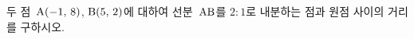 두 점~$\mathrm{A}(-1,\mkern3mu 8)$, $\mathrm{B}(5,\mkern3mu 2)$에 대하여 선분~$\mathrm{AB}$를 $2:1$로 내분하는 점과 원점 사이의 거리를 구하시오.
